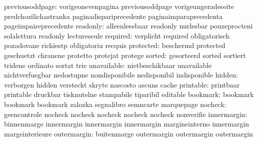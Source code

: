          previousoddpage: vorigeonevenpagina        previousoddpage
                           vorigeungeradeseite       predchozilichastranka
                           paginadispariprecedente   paginaimparaprecedenta
                           pageimpaireprecedente
                 readonly: alleenleesbaar            readonly
                           nurlesbar                 pouzeprocteni
                           solalettura               readonly
                           lectureseule
                 required: verplicht                 required
                           obligatorisch             pozadovane
                           richiestp                 obligatoriu
                           recquis
                protected: beschermd                 protected
                           geschuetzt                chranene
                           protetto                  protejat
                           protege
                   sorted: gesorteerd                sorted
                           sortiert                  tridene
                           ordinato                  sortat
                           trie
              unavailable: nietbeschikbaar           unavailable
                           nichtverfuegbar           nedostupne
                           nondisponibile            nedisponibil
                           indisponible
                   hidden: verborgen                 hidden
                           versteckt                 skryte
                           nascosto                  ascuns
                           cache
                printable: printbaar                 printable
                           druckbar                  tisknutelne
                           stampabile                tiparibil
                           editable
                 bookmark: bookmark                  bookmark
                           bookmark                  zalozka
                           segnalibro                semncarte
                           marquepage
                  nocheck: geencontrole              nocheck
                           nocheck                   nocheck
                           nocheck                   nocheck
                           nonverifie
              innermargin: binnenmarge               innermargin
                           innermargin               innermargin
                           margineinterno            innermargin
                           margeinterieure
              outermargin: buitenmarge               outermargin
                           outermargin               outermargin
